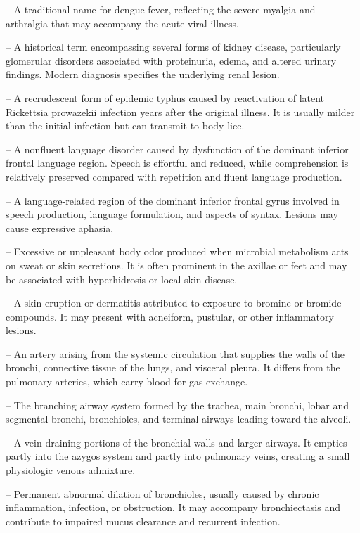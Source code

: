 -- A traditional name for dengue fever, reflecting the severe myalgia and arthralgia that may accompany the acute viral illness.

-- A historical term encompassing several forms of kidney disease, particularly glomerular disorders associated with proteinuria, edema, and altered urinary findings. Modern diagnosis specifies the underlying renal lesion.

-- A recrudescent form of epidemic typhus caused by reactivation of latent Rickettsia prowazekii infection years after the original illness. It is usually milder than the initial infection but can transmit to body lice.

-- A nonfluent language disorder caused by dysfunction of the dominant inferior frontal language region. Speech is effortful and reduced, while comprehension is relatively preserved compared with repetition and fluent language production.


-- A language-related region of the dominant inferior frontal gyrus involved in speech production, language formulation, and aspects of syntax. Lesions may cause expressive aphasia.

-- Excessive or unpleasant body odor produced when microbial metabolism acts on sweat or skin secretions. It is often prominent in the axillae or feet and may be associated with hyperhidrosis or local skin disease.

-- A skin eruption or dermatitis attributed to exposure to bromine or bromide compounds. It may present with acneiform, pustular, or other inflammatory lesions.

-- An artery arising from the systemic circulation that supplies the walls of the bronchi, connective tissue of the lungs, and visceral pleura. It differs from the pulmonary arteries, which carry blood for gas exchange.

-- The branching airway system formed by the trachea, main bronchi, lobar and segmental bronchi, bronchioles, and terminal airways leading toward the alveoli.


-- A vein draining portions of the bronchial walls and larger airways. It empties partly into the azygos system and partly into pulmonary veins, creating a small physiologic venous admixture.

-- Permanent abnormal dilation of bronchioles, usually caused by chronic inflammation, infection, or obstruction. It may accompany bronchiectasis and contribute to impaired mucus clearance and recurrent infection.


